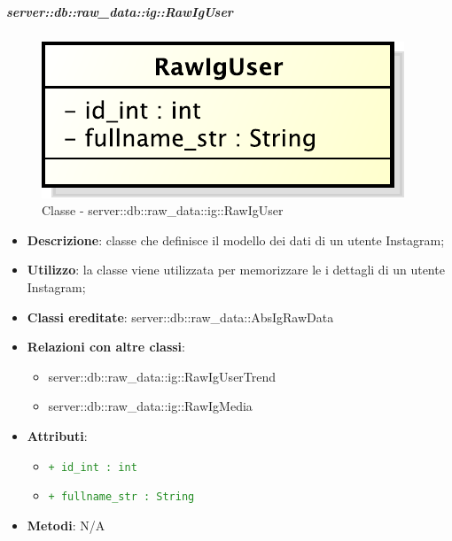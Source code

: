 		\subparagraph{server::db::raw\_data::ig::RawIgUser} %
		\label{subp:server_db_raw_data_ig_rawiguser}
			\begin{figure}[htbp]
				\centering
				\centerline{\includegraphics[scale=0.75]{./images/server/classes/db/raw_ig_user.pdf}}
				\caption{Classe - server::db::raw\_data::ig::RawIgUser}
			\end{figure}
			\begin{itemize}
				\item \textbf{Descrizione}: classe che definisce il modello dei dati di un utente Instagram;
				\item \textbf{Utilizzo}:  la classe viene utilizzata per memorizzare le i dettagli di un utente Instagram;
				\item \textbf{Classi ereditate}: server::db::raw\_data::AbsIgRawData
				\item \textbf{Relazioni con altre classi}:
					\begin{itemize}
						\item server::db::raw\_data::ig::RawIgUserTrend
						\item server::db::raw\_data::ig::RawIgMedia
					\end{itemize}
				\item \textbf{Attributi}:
					\begin{itemize}
						\item \textcolor{forestgreen}{\texttt{+ id\_int : int}}
						\item \textcolor{forestgreen}{\texttt{+ fullname\_str : String}}
					\end{itemize}
				\item \textbf{Metodi}: N/A
			\end{itemize}


